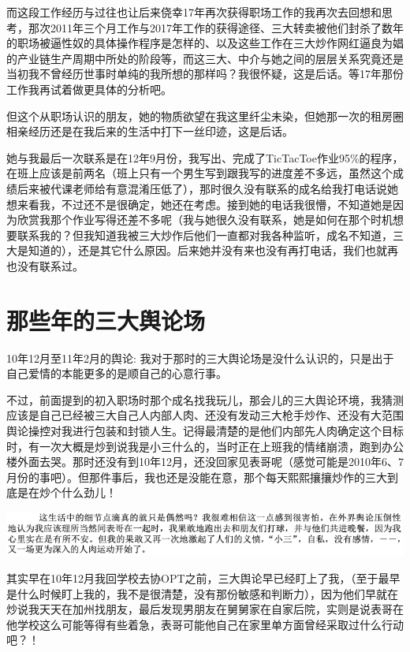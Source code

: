 \documentclass[9pt, b5paper]{article}
\begin{document}
而这段工作经历与过往也让后来侥幸17年再次获得职场工作的我再次去回想和思考，那次2011年三个月工作与2017年工作的获得途径、三大转卖被他们封杀了数年的职场被逼性奴的具体操作程序是怎样的、以及这些工作在三大炒作网红逼良为娼的产业链生产周期中所处的阶段等，而这三大、中介与她之间的层层关系究竟还是当初我不曾经历世事时单纯的我所想的那样吗？我很怀疑，这是后话。等17年那份工作我再试着做更具体的分析吧。 

但这个从职场认识的朋友，她的物质欲望在我这里纤尘未染，但她那一次的租房圈相亲经历还是在我后来的生活中打下一丝印迹，这是后话。 

她与我最后一次联系是在12年9月份，我写出、完成了TicTacToe作业95\%的程序，在班上应该是前两名（班上只有一个男生写到跟我写的进度差不多远，虽然这个成绩后来被代课老师给有意混淆压低了），那时很久没有联系的成名给我打电话说她想来看我，不过还不是很确定，她还在考虑。接到她的电话我很懵，不知道她是因为欣赏我那个作业写得还差不多呢（我与她很久没有联系，她是如何在那个时机想要联系我的？但我知道我被三大炒作后他们一直都对我各种监听，成名不知道，三大是知道的），还是其它什么原因。后来她并没有来也没有再打电话，我们也就再也没有联系过。 

\section{那些年的三大舆论场}
\label{sec:org68b5812}

10年12月至11年2月的舆论: 我对于那时的三大舆论场是没什么认识的，只是出于自己爱情的本能更多的是顺自己的心意行事。 

不过，前面提到的初入职场时那个成名找我玩儿，那会儿的三大舆论环境，我猜测应该是自己已经被三大自己人内部人肉、还没有发动三大枪手炒作、还没有大范围舆论操控对我进行包装和封锁人生。记得最清楚的是他们内部先人肉确定这个目标时，有一次大概是炒到说我是小三什么的，当时正在上班我的情绪崩溃，跑到办公楼外面去哭。那时还没有到10年12月，还没回家见表哥呢（感觉可能是2010年6、7月份的事吧）。但那件事后，我也还是没能在意，那个每天熙熙攘攘炒作的三大到底是在炒个什么劲儿！

\begin{center}
\includegraphics[width=.9\linewidth]{./pic/p1p46-2.png}
\end{center}

其实早在10年12月我回学校去协OPT之前，三大舆论早已经盯上了我，（至于最早是什么时候盯上我的，我不是很清楚，没有那份敏感和判断力），因为他们早就在炒说我天天在加州找朋友，最后发现男朋友在舅舅家在自家后院，实则是说表哥在他学校这么可能等得有些着急，表哥可能他自己在家里单方面曾经采取过什么行动吧？！ 
\end{document}
